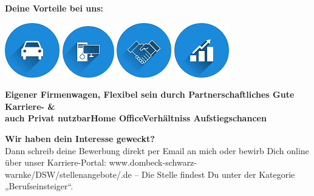\documentclass[12pt,utf8]{scrartcl}
\begin{document}
\begin{flushleft}
\begin{center}
	\textbf{Deine Vorteile bei uns:}
\end{center}

\begin{center}
	\includegraphics{images/auto}\label{fig:auto}\hspace{1,5cm}
	\includegraphics{images/home}\label{fig:home}\hspace{1,5cm}	
	\includegraphics{images/handshake}\label{fig:handshake}\hspace{1,5cm}		
	\includegraphics{images/statistics}\label{fig:statistics}  
\end{center}
\hspace{0,3cm}\textbf{Eigener Firmenwagen,\hspace{0,7cm} Flexibel sein durch \hspace{0,9cm}Partnerschaftliches \hspace{1,1cm}Gute Karriere- \& \\ \hspace{0,4cm}auch Privat nutzbar\hspace{1,5cm}Home Office\hspace{2,1cm}Verhältniss \hspace{2cm}Aufstiegschancen} 			

\vspace{1cm}
\textbf{Wir haben dein Interesse geweckt?}\\
Dann schreib deine Bewerbung direkt per Email an mich oder bewirb Dich online über unser Karriere-Portal: www.dombeck-schwarz-warnke/DSW/stellenangebote/.de – Die Stelle findest Du unter der Kategorie „Berufseinsteiger“.

\normalsize
\newpage
{}



\end{flushleft}
\end{document}
